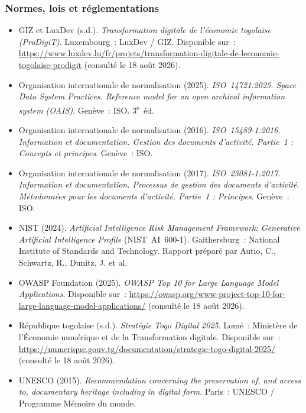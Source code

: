 \documentclass[12pt,a4paper]{report}
\begin{document}
\subsubsection*{Normes, lois et réglementations}
\begin{itemize}[leftmargin=1.5em, itemsep=0.6em, label={}]
  \item\label{ref:prodigit} GIZ et LuxDev (s.d.). \textit{Transformation digitale de l'économie togolaise (ProDigiT)}. Luxembourg~: LuxDev / GIZ. Disponible sur~: \url{https://www.luxdev.lu/fr/projets/transformation-digitale-de-leconomie-togolaise-prodigit} (consulté le 18 août 2026).

  \item\label{ref:iso14721} Organisation internationale de normalisation (2025). \textit{\mbox{ISO 14721:2025}. Space Data System Practices. Reference model for an open archival information system (OAIS)}. Genève~: ISO. 3\textsuperscript{e}~éd.

  \item\label{ref:iso15489} Organisation internationale de normalisation (2016). \textit{\mbox{ISO 15489-1:2016}. Information et documentation. Gestion des documents d'activité. Partie~1 : Concepts et principes}. Genève~: ISO.

  \item\label{ref:iso23081} Organisation internationale de normalisation (2017). \textit{\mbox{ISO 23081-1:2017}. Information et documentation. Processus de gestion des documents d'activité. Métadonnées pour les documents d'activité. Partie~1 : Principes}. Genève~: ISO.

  \item\label{ref:nist2024} NIST (2024). \textit{Artificial Intelligence Risk Management Framework: Generative Artificial Intelligence Profile} (NIST~AI~600-1). Gaithersburg~: National Institute of Standards and Technology. Rapport préparé par Autio, C., Schwartz, R., Dunitz, J. et al.

  \item\label{ref:owasp2025} OWASP Foundation (2025). \textit{OWASP Top 10 for Large Language Model Applications}. Disponible sur~: \url{https://owasp.org/www-project-top-10-for-large-language-model-applications/} (consulté le 18 août 2026).

  \item\label{ref:togodigital2025} République togolaise (s.d.). \textit{Stratégie Togo Digital 2025}. Lomé~: Ministère de l'Économie numérique et de la Transformation digitale. Disponible sur~: \url{https://numerique.gouv.tg/documentation/strategie-togo-digital-2025/} (consulté le 18 août 2026).

  \item\label{ref:unesco2015} UNESCO (2015). \textit{Recommendation concerning the preservation of, and access to, documentary heritage including in digital form}. Paris~: UNESCO / Programme Mémoire du monde.
\end{itemize}
\end{document}
